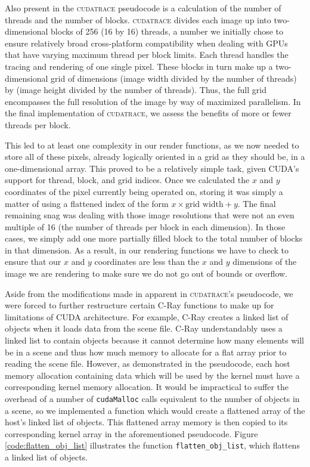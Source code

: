 \documentclass[12pt]{article}
\begin{document}
Also present in the \textsc{cudatrace} pseudocode is a calculation of the number of threads and the number of blocks. \textsc{cudatrace} divides each image up into two-dimensional blocks of 256 (16 by 16) threads, a number we initially chose to ensure relatively broad cross-platform compatibility when dealing with GPUs that have varying maximum thread per block limits. Each thread handles the tracing and rendering of one single pixel. These blocks in turn make up a two-dimensional grid of dimensions (image width divided by the number of threads) by (image height divided by the number of threads). Thus, the full grid encompasses the full resolution of the image by way of maximized parallelism. In the final implementation of \textsc{cudatrace}, we assess the benefits of more or fewer threads per block.

This led to at least one complexity in our render functions, as we now needed to store all of these pixels, already logically oriented in a grid as they should be, in a one-dimensional array. This proved to be a relatively simple task, given CUDA's support for thread, block, and grid indices. Once we calculated the $x$ and $y$ coordinates of the pixel currently being operated on, storing it was simply a matter of using a flattened index of the form $x \times \text{grid width} + y$. The final remaining snag was dealing with those image resolutions that were not an even multiple of 16 (the number of threads per block in each dimension). In those cases, we simply add one more partially filled block to the total number of blocks in that dimension. As a result, in our rendering functions we have to check to ensure that our $x$ and $y$ coordinates are less than the $x$ and $y$ dimensions of the image we are rendering to make sure we do not go out of bounds or overflow. 

Aside from the modifications made in apparent in \textsc{cudatrace}'s pseudocode, we were forced to further restructure certain C-Ray functions to make up for limitations of CUDA architecture. For example, C-Ray creates a linked list of objects when it loads data from the scene file. C-Ray understandably uses a linked list to contain objects because it cannot determine how many elements will be in a scene and thus how much memory to allocate for a flat array prior to reading the scene file. However, as demonstrated in the pseudocode, each host memory allocation containing data which will be used by the kernel must have a corresponding kernel memory allocation. It would be impractical to suffer the overhead of a number of \texttt{cudaMalloc} calls equivalent to the number of objects in a scene, so we implemented a function which would create a flattened array of the host's linked list of objects. This flattened array memory is then copied to its corresponding kernel array in the aforementioned pseudocode. Figure \ref{code:flatten_obj_list} illustrates the function \texttt{flatten\_obj\_list}, which flattens a linked list of objects.
\end{document}
